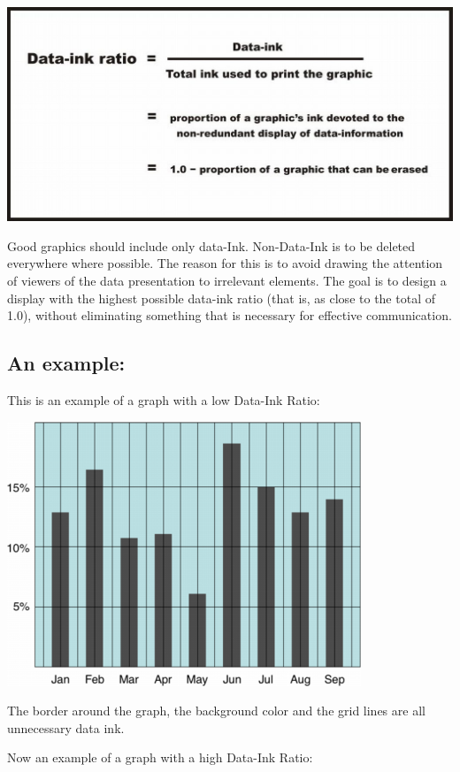 \documentclass[
]{book}
\begin{document}
\includegraphics{imgs/data_ink_ratio.jpg}

Good graphics should include only data-Ink. Non-Data-Ink is to be deleted everywhere where possible. The reason for this is to avoid drawing the attention of viewers of the data presentation to irrelevant elements.
The goal is to design a display with the highest possible data-ink ratio (that is, as close to the total of 1.0), without eliminating something that is necessary for effective communication.

\hypertarget{an-example}{%
\subsection{An example:}\label{an-example}}

This is an example of a graph with a low Data-Ink Ratio:

\includegraphics{imgs/low_data_ink_ratio.png}

The border around the graph, the background color and the grid lines are all unnecessary data ink.

Now an example of a graph with a high Data-Ink Ratio:
\end{document}
